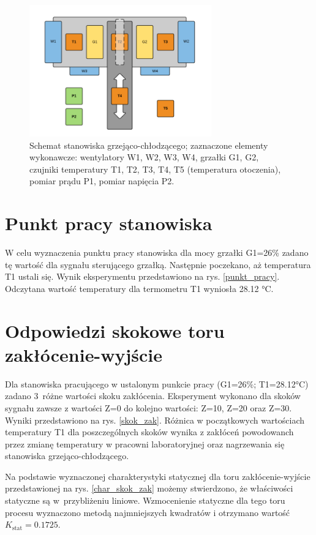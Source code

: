 \documentclass[a4paper,titlepage,11pt,twosides,floatssmall]{mwrep}
\begin{document}
\begin{figure}[H]
		\centering
		\includegraphics[width=0.7\textwidth]{ ./Rysunki/Stanowisko-grzewcze-schemat.png }
		\caption {Schemat stanowiska grzejąco-chłodzącego; zaznaczone elementy wykonawcze: wentylatory W1, W2, W3, W4, grzałki G1, G2, czujniki temperatury T1, T2, T3, T4, T5 (temperatura
otoczenia), pomiar prądu P1, pomiar napięcia P2.}
		\label{stanowisko_grzewcze_schemat}
\end{figure}

\section{Punkt pracy stanowiska}
W celu wyznaczenia punktu pracy stanowiska dla mocy grzałki G1=26\% zadano tę wartość dla sygnału sterującego grzałką. Następnie poczekano, aż temperatura T1 ustali się. Wynik eksperymentu przedstawiono na rys. \ref{punkt_pracy}. Odczytana wartość temperatury dla termometru T1 wyniosła \num{28.12} °C.



\section{Odpowiedzi skokowe toru zakłócenie-wyjście}
Dla stanowiska pracującego w ustalonym punkcie pracy (G1=26\%; T1=\num{28.12}°C) zadano 3~różne wartości skoku zakłócenia. Eksperyment wykonano dla skoków sygnału zawsze z wartości Z=0 do kolejno wartości: Z=10, Z=20 oraz Z=30. Wyniki przedstawiono na rys. \ref{skok_zak}. Różnica w początkowych wartościach temperatury T1 dla poszczególnych skoków wynika z zakłóceń powodowanch przez zmianę temperatury w pracowni laboratoryjnej oraz nagrzewania się stanowiska grzejąco-chłodzącego.


Na podstawie wyznaczonej charakterystyki statycznej dla toru zakłócenie-wyjście przedstawionej na rys. \ref{char_skok_zak} możemy stwierdzono, że właściwości statyczne są w~przybliżeniu liniowe. Wzmocenienie statyczne dla tego toru procesu wyznaczono metodą najmniejszych kwadratów i otrzymano wartość $K_{\mathrm{stat}}=0.1725$.
\end{document}
